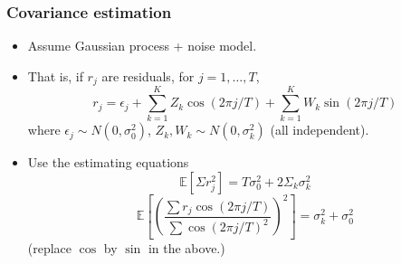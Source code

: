 \documentclass{beamer}
\begin{document}
\begin{frame}
\frametitle{Covariance estimation}
\begin{itemize}
\item Assume Gaussian process + noise model.
\item That is, if $r_j$ are residuals, for $j = 1,\hdots,T$,
\[
r_j = \epsilon_j + \sum_{k=1}^K Z_k \cos(2\pi j/T) + \sum_{k=1}^K W_k \sin(2\pi j/T)
\]
where $\epsilon_j \sim N(0,\sigma^2_0)$, $Z_k, W_k \sim N(0,\sigma^2_k)$ (all independent).
\item Use the estimating equations 
\[
\mathbb{E}[\Sigma r_j^2] = T\sigma_0^2 + 2\Sigma_k \sigma^2_k 
\]
\[\mathbb{E}\left[\left(\frac{\sum r_j \cos(2\pi j/T)}{\sum \cos(2\pi j/T)^2}\right)^2\right] = \sigma^2_k +\sigma^2_0\]
(replace $\cos$ by $\sin$ in the above.)
\end{itemize}
\end{frame}
\end{document}
